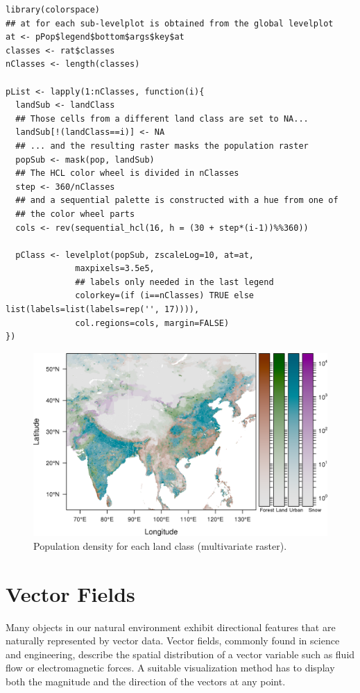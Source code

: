 \documentclass[smallroyalvopaper]{memoir}
\begin{document}
\lstset{language=R,numbers=none}
\begin{lstlisting}
library(colorspace)
## at for each sub-levelplot is obtained from the global levelplot
at <- pPop$legend$bottom$args$key$at
classes <- rat$classes
nClasses <- length(classes)

pList <- lapply(1:nClasses, function(i){
  landSub <- landClass
  ## Those cells from a different land class are set to NA...
  landSub[!(landClass==i)] <- NA
  ## ... and the resulting raster masks the population raster
  popSub <- mask(pop, landSub)
  ## The HCL color wheel is divided in nClasses
  step <- 360/nClasses
  ## and a sequential palette is constructed with a hue from one of
  ## the color wheel parts
  cols <- rev(sequential_hcl(16, h = (30 + step*(i-1))%%360))

  pClass <- levelplot(popSub, zscaleLog=10, at=at,
		      maxpixels=3.5e5,
		      ## labels only needed in the last legend
		      colorkey=(if (i==nClasses) TRUE else list(labels=list(labels=rep('', 17)))),
		      col.regions=cols, margin=FALSE)
})
\end{lstlisting}


\begin{figure}[htb]
\centering
\includegraphics[width=.9\linewidth]{figs/popLandClass.png}
\caption{\label{fig:popLandClass}Population density for each land class (multivariate raster).}
\end{figure}

\section{Vector Fields}
\label{sec-1}
\label{sec:vector}

Many objects in our natural environment exhibit directional
features that are naturally represented by vector data. Vector
fields, commonly found in science and engineering, describe the
spatial distribution of a vector variable such as fluid flow or
electromagnetic forces. A suitable visualization method has to
display both the magnitude and the direction of the vectors at any
point.
\end{document}
